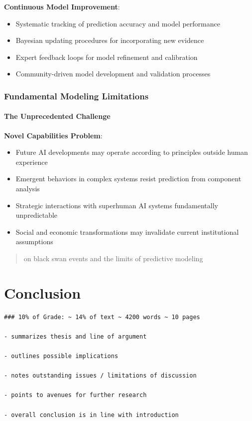 \documentclass[
  11pt,
  letterpaper,
]{book}
\providecommand{\tightlist}{%
  \setlength{\itemsep}{0pt}\setlength{\parskip}{0pt}}
\begin{document}
\textbf{Continuous Model Improvement}:

\begin{itemize}
\tightlist
\item
  Systematic tracking of prediction accuracy and model performance
\item
  Bayesian updating procedures for incorporating new evidence
\item
  Expert feedback loops for model refinement and calibration
\item
  Community-driven model development and validation processes
\end{itemize}

\subsection{Fundamental Modeling
Limitations}\label{sec-fundamental-limitations}

\subsubsection{The Unprecedented
Challenge}\label{sec-unprecedented-challenge}

\textbf{Novel Capabilities Problem}:

\begin{itemize}
\tightlist
\item
  Future AI developments may operate according to principles outside
  human experience
\item
  Emergent behaviors in complex systems resist prediction from component
  analysis
\item
  Strategic interactions with superhuman AI systems fundamentally
  unpredictable
\item
  Social and economic transformations may invalidate current
  institutional assumptions
\end{itemize}

\begin{quote}
\textcite{taleb2007} on black swan events and the limits of predictive
modeling
\end{quote}


\chapter{Conclusion}\label{conclusion}

\begin{verbatim}
### 10% of Grade: ~ 14% of text ~ 4200 words ~ 10 pages

- summarizes thesis and line of argument

- outlines possible implications

- notes outstanding issues / limitations of discussion

- points to avenues for further research

- overall conclusion is in line with introduction
\end{verbatim}
\end{document}
